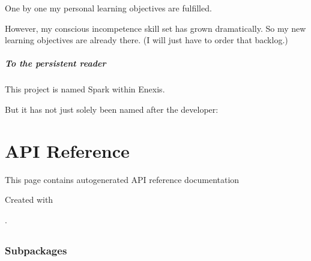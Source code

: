 \documentclass[letterpaper,10pt,english]{sphinxmanual}
\begin{document}
One by one my personal learning objectives are fulfilled.

However, my conscious incompetence skill set has grown dramatically.
So my new learning objectives are already there. (I will just have to order that backlog.)


\paragraph{To the persistent reader}
\label{\detokenize{deployment:to-the-persistent-reader}}
This project is named Spark within Enexis.

But it has not just solely been named after the developer: 


\chapter{API Reference}
\label{\detokenize{autoapi/index:api-reference}}\label{\detokenize{autoapi/index::doc}}
This page contains auto\sphinxhyphen{}generated API reference documentation %
\begin{footnote}[1]\sphinxAtStartFootnote
Created with 
%
\end{footnote}.


\section{}
\label{\detokenize{autoapi/src/index:module-src}}\label{\detokenize{autoapi/src/index:src}}\label{\detokenize{autoapi/src/index::doc}}

\subsection{Subpackages}
\label{\detokenize{autoapi/src/index:subpackages}}

\subsubsection{}
\label{\detokenize{autoapi/src/forecast/index:module-src.forecast}}\label{\detokenize{autoapi/src/forecast/index:src-forecast}}\label{\detokenize{autoapi/src/forecast/index::doc}}
\end{document}
